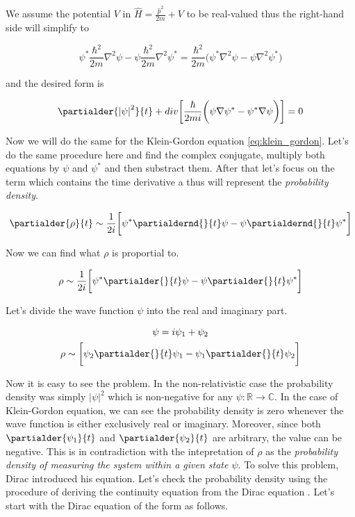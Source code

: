 We assume the potential $V$ in $\hat{H} = \frac{\hat{p}^{2}}{2m} + V$ to be real-valued thus the right-hand side
will simplify to

\begin{equation*}
    \psi^{*} \frac{\hbar^{2}}{2m} \nabla^{2} \psi - \psi \frac{\hbar^{2}}{2m} \nabla^{2} \psi^{*} 
    = \frac{\hbar^{2}}{2m} \bigg( \psi^{*} \nabla^{2} \psi - \psi \nabla^{2} \psi^{*} \bigg)
\end{equation*}

and the desired form is

\begin{equation*}
    \partialder{\left|\psi\right|^{2}}{t} + div \bigg[ \frac{\hbar}{2mi} \bigg( \psi \nabla \psi^{*} - \psi^{*} \nabla \psi \bigg) \bigg] = 0
\end{equation*}

Now we will do the same for the Klein-Gordon equation \ref{eq:klein_gordon}. Let's do the same procedure here and
find the complex conjugate, multiply both equations by $\psi$ and $\psi^{*}$ and then substract them. After that 
let's focus on the term which contains the time derivative a thus will represent the \textit{probability density}.

\begin{equation*}
    \partialder{\rho}{t} \sim \frac{1}{2i} \bigg[ \psi^{*} \partialdernd{}{t} \psi - \psi \partialdernd{}{t} \psi^{*} \bigg]
\end{equation*}

Now we can find what $\rho$ is proportial to. 

\begin{equation}
    \rho \sim \frac{1}{2i} \bigg[ \psi^{*} \partialder{}{t} \psi - \psi \partialder{}{t} \psi^{*} \bigg]
\end{equation}

Let's divide the wave function $\psi$ into the real and imaginary part.

\begin{equation*}
    \begin{gathered}
        \psi = i \psi_{1} + \psi_{2} \\
        \rho \sim \bigg[ \psi_{2} \partialder{}{t} \psi_{1} - \psi_{1} \partialder{}{t} \psi_{2} \bigg]
    \end{gathered}
\end{equation*}

Now it is easy to see the problem. In the non-relativistic case the probability density was simply $|\psi|^{2}$ which is
non-negative for any $\psi: \mathbb{R} \to \mathbb{C}$. In the case of Klein-Gordon equation, we can see the probability 
density is zero whenever the wave function is either exclusively real or imaginary. Moreover, since both 
$\partialder{\psi_{1}}{t}$ and $\partialder{\psi_{2}}{t}$ are arbitrary, the value can be negative. This is in contradiction
with the intepretation of $\rho$ as the \textit{probability density of measuring the system within a given state $\psi$}.
To solve this problem, Dirac introduced his equation. Let's check the probability density using the procedure of deriving
the continuity equation from the Dirac equation \cite{dirac_equation_history}. Let's start with the Dirac equation of the 
form as follows.

